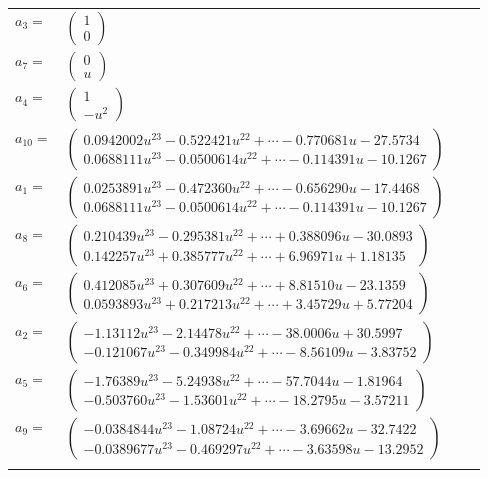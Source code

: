 \documentclass[1p]{elsarticle_modified}
\theoremstyle{definition}
\begin{document}
\begin{tabular}{m{7pt} m{180pt} m{7pt} m{180pt} }
\flushright $a_{3}=$&$\begin{pmatrix}1\\0\end{pmatrix}$ \\
\flushright $a_{7}=$&$\begin{pmatrix}0\\u\end{pmatrix}$ \\
\flushright $a_{4}=$&$\begin{pmatrix}1\\- u^2\end{pmatrix}$ \\
\flushright $a_{10}=$&$\begin{pmatrix}0.0942002 u^{23}-0.522421 u^{22}+\cdots-0.770681 u-27.5734\\0.0688111 u^{23}-0.0500614 u^{22}+\cdots-0.114391 u-10.1267\end{pmatrix}$ \\
\flushright $a_{1}=$&$\begin{pmatrix}0.0253891 u^{23}-0.472360 u^{22}+\cdots-0.656290 u-17.4468\\0.0688111 u^{23}-0.0500614 u^{22}+\cdots-0.114391 u-10.1267\end{pmatrix}$ \\
\flushright $a_{8}=$&$\begin{pmatrix}0.210439 u^{23}-0.295381 u^{22}+\cdots+0.388096 u-30.0893\\0.142257 u^{23}+0.385777 u^{22}+\cdots+6.96971 u+1.18135\end{pmatrix}$ \\
\flushright $a_{6}=$&$\begin{pmatrix}0.412085 u^{23}+0.307609 u^{22}+\cdots+8.81510 u-23.1359\\0.0593893 u^{23}+0.217213 u^{22}+\cdots+3.45729 u+5.77204\end{pmatrix}$ \\
\flushright $a_{2}=$&$\begin{pmatrix}-1.13112 u^{23}-2.14478 u^{22}+\cdots-38.0006 u+30.5997\\-0.121067 u^{23}-0.349984 u^{22}+\cdots-8.56109 u-3.83752\end{pmatrix}$ \\
\flushright $a_{5}=$&$\begin{pmatrix}-1.76389 u^{23}-5.24938 u^{22}+\cdots-57.7044 u-1.81964\\-0.503760 u^{23}-1.53601 u^{22}+\cdots-18.2795 u-3.57211\end{pmatrix}$ \\
\flushright $a_{9}=$&$\begin{pmatrix}-0.0384844 u^{23}-1.08724 u^{22}+\cdots-3.69662 u-32.7422\\-0.0389677 u^{23}-0.469297 u^{22}+\cdots-3.63598 u-13.2952\end{pmatrix}$\\&\end{tabular}
\end{document}
